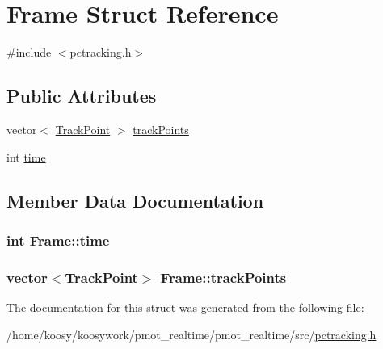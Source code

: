 \hypertarget{struct_frame}{\section{\-Frame \-Struct \-Reference}
\label{struct_frame}
}


{\ttfamily \#include $<$pctracking.\-h$>$}

\subsection*{\-Public \-Attributes}
\begin{DoxyCompactItemize}
\item 
vector$<$ \hyperlink{struct_track_point}{\-Track\-Point} $>$ \hyperlink{struct_frame_a7c3e2c360430d7c57f9c278aa5d2a7df}{track\-Points}
\item 
int \hyperlink{struct_frame_a08231d06b0a2f5074fa7f4128168a9c0}{time}
\end{DoxyCompactItemize}


\subsection{\-Member \-Data \-Documentation}
\hypertarget{struct_frame_a08231d06b0a2f5074fa7f4128168a9c0}{
\subsubsection[{time}]{\setlength{\rightskip}{0pt plus 5cm}int {\bf \-Frame\-::time}}}\label{struct_frame_a08231d06b0a2f5074fa7f4128168a9c0}
\hypertarget{struct_frame_a7c3e2c360430d7c57f9c278aa5d2a7df}{
\subsubsection[{track\-Points}]{\setlength{\rightskip}{0pt plus 5cm}vector$<${\bf \-Track\-Point}$>$ {\bf \-Frame\-::track\-Points}}}\label{struct_frame_a7c3e2c360430d7c57f9c278aa5d2a7df}


\-The documentation for this struct was generated from the following file\-:\begin{DoxyCompactItemize}
\item 
/home/koosy/koosywork/pmot\-\_\-realtime/pmot\-\_\-realtime/src/\hyperlink{pctracking_8h}{pctracking.\-h}\end{DoxyCompactItemize}
